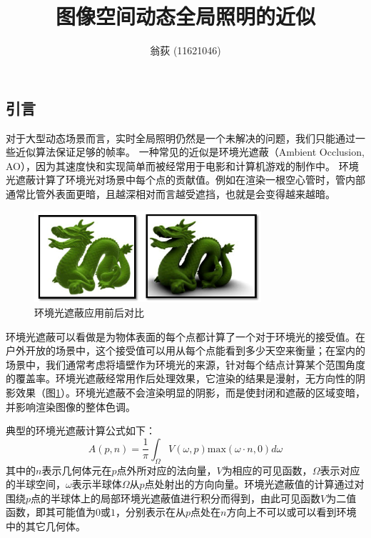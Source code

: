 \documentclass[10pt,a4paper]{article}
\theoremstyle{mythm}%
\numberwithin{equation}{section}
\begin{document}
\setlength{\abovedisplayskip}{1ex} %
\setlength{\belowdisplayskip}{1ex} %
\begin{CJK*}{UTF8}{song}

\author{翁荻 (11621046)}                                 %
\title{图像空间动态全局照明的近似}              %
\maketitle                                           %

\section{引言}
对于大型动态场景而言，实时全局照明仍然是一个未解决的问题，我们只能通过一些近似算法保证足够的帧率。
一种常见的近似是环境光遮蔽（Ambient Occlusion, AO），因为其速度快和实现简单而被经常用于电影和计算机游戏的制作中。
环境光遮蔽计算了环境光对场景中每个点的贡献值。例如在渲染一根空心管时，管内部通常比管外表面更暗，且越深相对而言越受遮挡，也就是会变得越来越暗。

\begin{figure}[htbp]
    \vspace{-1mm}
	\centering
  	\includegraphics[width=0.75\textwidth]{fig/ao}
    \vspace{-4mm}
  	\caption{环境光遮蔽应用前后对比}
  	\label{fig:ao}
    \vspace{-1mm}
\end{figure}

环境光遮蔽可以看做是为物体表面的每个点都计算了一个对于环境光的接受值。在户外开放的场景中，这个接受值可以用从每个点能看到多少天空来衡量；在室内的场景中，我们通常考虑将墙壁作为环境光的来源，针对每个结点计算某个范围角度的覆盖率。环境光遮蔽经常用作后处理效果，它渲染的结果是漫射，无方向性的阴影效果（图\ref{fig:ao}）。环境光遮蔽不会渲染明显的阴影，而是使封闭和遮蔽的区域变暗，并影响渲染图像的整体色调。

典型的环境光遮蔽计算公式如下：
\begin{equation*}
A(p,n)=\frac{1}{\pi}\int_{\Omega}V(\omega,p)\text{max}(\omega\cdot n, 0)d\omega
\end{equation*}
其中的$n$表示几何体元在$p$点外所对应的法向量，$V$为相应的可见函数，$\Omega$表示对应的半球空间，$\omega$表示半球体$\Omega$从$p$点处射出的方向向量。环境光遮蔽值的计算通过对围绕$p$点的半球体上的局部环境光遮蔽值进行积分而得到，由此可见函数$V$为二值函数，即其可能值为$0$或$1$，分别表示在从$p$点处在$n$方向上不可以或可以看到环境中的其它几何体。


\end{CJK*}
\end{document}
